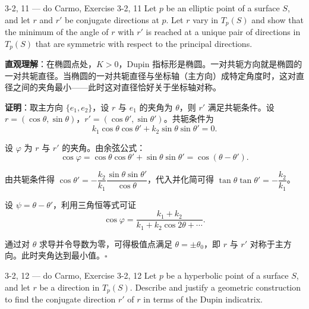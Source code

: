 \begin{exercise}{3-2, 11 — do Carmo, Exercise 3-2, 11}
Let $p$ be an elliptic point of a surface $S$, and let $r$ and $r'$ be conjugate directions at $p$. Let $r$ vary in $T_p(S)$ and show that the minimum of the angle of $r$ with $r'$ is reached at a unique pair of directions in $T_p(S)$ that are symmetric with respect to the principal directions.
\end{exercise}

\begin{solution}
\textbf{直观理解}：在椭圆点处，$K > 0$，Dupin 指标形是椭圆。一对共轭方向就是椭圆的一对共轭直径。当椭圆的一对共轭直径与坐标轴（主方向）成特定角度时，这对直径之间的夹角最小——此时这对直径恰好关于坐标轴对称。

\textbf{证明}：取主方向 $\{e_1, e_2\}$，设 $r$ 与 $e_1$ 的夹角为 $\theta$，则 $r'$ 满足共轭条件。设 $r = (\cos\theta, \sin\theta)$，$r' = (\cos\theta', \sin\theta')$。共轭条件为
\[
k_1 \cos\theta\cos\theta' + k_2 \sin\theta\sin\theta' = 0.
\]

设 $\varphi$ 为 $r$ 与 $r'$ 的夹角。由余弦公式：
\[
\cos\varphi = \cos\theta\cos\theta' + \sin\theta\sin\theta' = \cos(\theta - \theta').
\]

由共轭条件得 $\cos\theta' = -\dfrac{k_2}{k_1} \dfrac{\sin\theta\sin\theta'}{\cos\theta}$，代入并化简可得 $\tan\theta\tan\theta' = -\dfrac{k_2}{k_1}$。

设 $\psi = \theta - \theta'$，利用三角恒等式可证
\[
\cos\varphi = \frac{k_1 + k_2}{k_1 + k_2 \cos 2\theta + \cdots}.
\]

通过对 $\theta$ 求导并令导数为零，可得极值点满足 $\theta = \pm \theta_0$，即 $r$ 与 $r'$ 对称于主方向。此时夹角达到最小值。$\square$
\end{solution}

\begin{exercise}{3-2, 12 — do Carmo, Exercise 3-2, 12}
Let $p$ be a hyperbolic point of a surface $S$, and let $r$ be a direction in $T_{p}(S)$. Describe and justify a geometric construction to find the conjugate direction $r'$ of $r$ in terms of the Dupin indicatrix.
\end{exercise}

